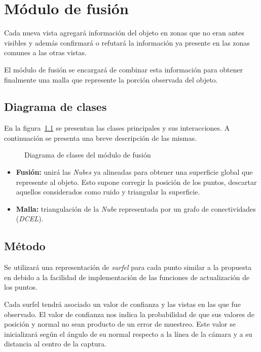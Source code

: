 \chapter{Módulo de fusión}
	Cada nueva vista agregará información del objeto en zonas que no eran antes visibles
	y además confirmará o refutará la información ya presente en las zonas comunes a las otras vistas.

	El módulo de fusión se encargará de combinar esta información para obtener
	finalmente una malla que represente la porción observada del objeto.

	\section{Diagrama de clases}
		En la figura~\ref{fig:fusion_class} se presentan las clases principales y sus interacciones.
		A continuación se presenta una breve descripción de las mismas.
		\begin{figure}
			\caption{\label{fig:fusion_class}Diagrama de clases del módulo de fusión}
		\end{figure}

		\begin{itemize}
			\item {\bfseries Fusión:} unirá las \emph{Nubes} ya alineadas para
				obtener una superficie global que represente al objeto.
				Esto supone corregir la posición de los puntos, descartar
				aquellos considerados como ruido y triangular la superficie.
			\item {\bfseries Malla:} triangulación de la \emph{Nube} representada por un grafo de conectividades (\emph{DCEL}).
		\end{itemize}


	\section{Método}
	Se utilizará una representación de \emph{surfel} para cada punto similar a la propuesta en %
	debido a la facilidad de implementación de las funciones de actualización de los puntos.

	Cada surfel tendrá asociado un valor de confianza y las vistas en las que
	fue observado.  El valor de confianza nos indica la probabilidad de que sus
	valores de posición y normal no sean producto de un error de muestreo.
	Este valor se inicializará según el ángulo de su normal respecto a la línea
	de la cámara y a su distancia al centro de la captura.


